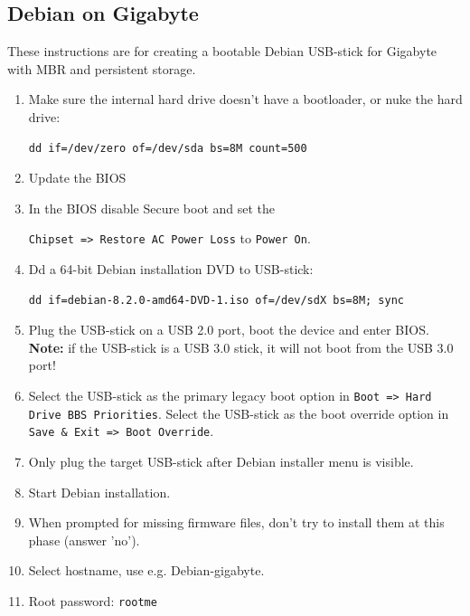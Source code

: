 \documentclass[a4paper,11pt]{article}
\newcommand{\note}{\textbf{Note: }}
\newcommand{\cmd}[1]{\texttt{#1}}
\begin{document}
\subsection{Debian on Gigabyte}
These instructions are for creating a bootable Debian USB-stick for Gigabyte with MBR and persistent storage.

\begin{enumerate}
\item Make sure the internal hard drive doesn't have a bootloader, or nuke the hard drive: 

\begin{lstlisting}
dd if=/dev/zero of=/dev/sda bs=8M count=500
\end{lstlisting}

\item Update the BIOS

\item In the BIOS disable Secure boot and set the

\cmd{Chipset => Restore AC Power Loss} to \cmd{Power On}.

\item Dd a 64-bit Debian installation DVD to USB-stick:


\begin{lstlisting}
dd if=debian-8.2.0-amd64-DVD-1.iso of=/dev/sdX bs=8M; sync
\end{lstlisting}

\item Plug the USB-stick on a USB 2.0 port, boot the device and enter BIOS. \note if the USB-stick is a USB 3.0 stick, it will not boot from the USB 3.0 port!

\item Select the USB-stick as the primary legacy boot option in \cmd{Boot => Hard Drive BBS Priorities}. Select the USB-stick as the boot override option in \cmd{Save \& Exit => Boot Override}.

\item Only plug the target USB-stick after Debian installer menu is visible.

\item Start Debian installation.

\item When prompted for missing firmware files, don't try to install them at this phase (answer 'no').

\item Select hostname, use e.g. Debian-gigabyte.

\item Root password: \cmd{rootme}


\end{enumerate}
\end{document}
